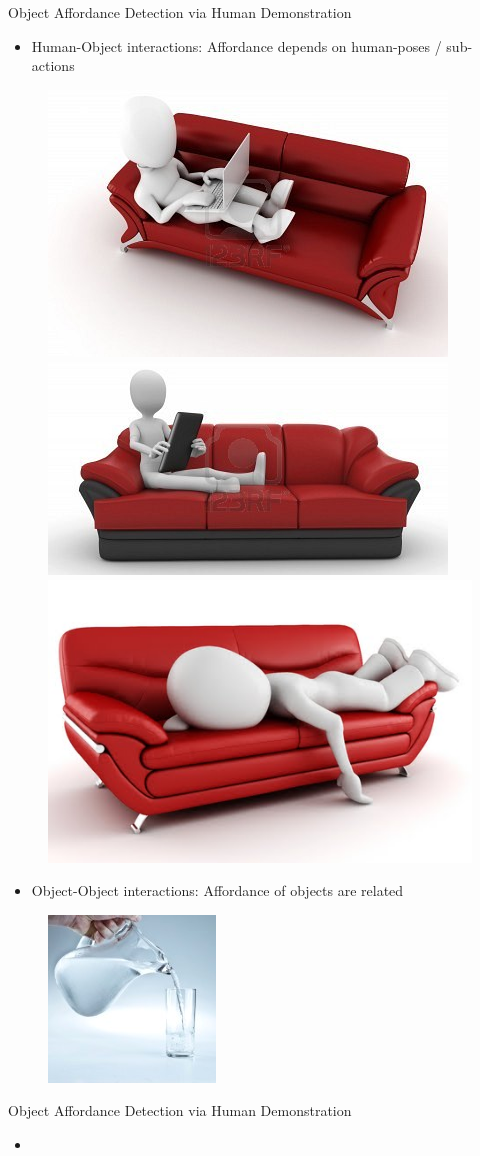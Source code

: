 \documentclass{beamer}
\begin{document}
\begin{frame}{Object Affordance Detection via Human Demonstration}
\begin{itemize}
\item Human-Object interactions: Affordance depends on human-poses / sub-actions
\end{itemize}
\begin{figure}[t!]
\includegraphics[width=.25\linewidth]{couch_sit.jpg}
\includegraphics[width=.25\linewidth]{couch_read.jpg}
\includegraphics[width=.25\linewidth]{couch_sleep.jpg}
\end{figure}
\begin{itemize}
\item Object-Object interactions: Affordance of objects are related
\end{itemize}
\begin{figure}[h]
\includegraphics[width=.25\linewidth]{pitcher-pouring.jpg}
\end{figure}
\end{frame}

\begin{frame}{Object Affordance Detection via Human Demonstration}
\begin{itemize}
\item 
\end{itemize}

\end{frame}
\end{document}
